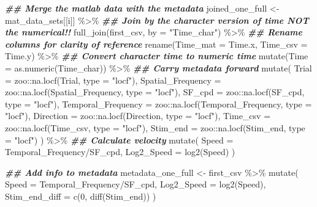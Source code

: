 \documentclass[
]{book}
\newenvironment{Shaded}{\begin{snugshade}}{\end{snugshade}}
\newcommand{\AttributeTok}[1]{\textcolor[rgb]{0.77,0.63,0.00}{#1}}
\newcommand{\DecValTok}[1]{\textcolor[rgb]{0.00,0.00,0.81}{#1}}
\newcommand{\DocumentationTok}[1]{\textcolor[rgb]{0.56,0.35,0.01}{\textbf{\textit{#1}}}}
\newcommand{\FunctionTok}[1]{\textcolor[rgb]{0.00,0.00,0.00}{#1}}
\newcommand{\NormalTok}[1]{#1}
\newcommand{\OtherTok}[1]{\textcolor[rgb]{0.56,0.35,0.01}{#1}}
\newcommand{\SpecialCharTok}[1]{\textcolor[rgb]{0.00,0.00,0.00}{#1}}
\newcommand{\StringTok}[1]{\textcolor[rgb]{0.31,0.60,0.02}{#1}}
\begin{document}
\begin{Shaded}
\begin{Highlighting}[]
  \DocumentationTok{\#\# Merge the matlab data with the metadata}
\NormalTok{  joined\_one\_full }\OtherTok{\textless{}{-}}
\NormalTok{    mat\_data\_sets[[i]] }\SpecialCharTok{\%\textgreater{}\%}
    \DocumentationTok{\#\# Join by the character version of time NOT the numerical!!}
    \FunctionTok{full\_join}\NormalTok{(first\_csv, }\AttributeTok{by =} \StringTok{"Time\_char"}\NormalTok{) }\SpecialCharTok{\%\textgreater{}\%}
    \DocumentationTok{\#\# Rename columns for clarity of reference}
    \FunctionTok{rename}\NormalTok{(}\AttributeTok{Time\_mat =}\NormalTok{ Time.x,}
           \AttributeTok{Time\_csv =}\NormalTok{ Time.y) }\SpecialCharTok{\%\textgreater{}\%}
    \DocumentationTok{\#\# Convert character time to numeric time}
    \FunctionTok{mutate}\NormalTok{(}\AttributeTok{Time =} \FunctionTok{as.numeric}\NormalTok{(Time\_char)) }\SpecialCharTok{\%\textgreater{}\%}
    \DocumentationTok{\#\# Carry metadata forward}
    \FunctionTok{mutate}\NormalTok{(}
      \AttributeTok{Trial =}\NormalTok{ zoo}\SpecialCharTok{::}\FunctionTok{na.locf}\NormalTok{(Trial, }\AttributeTok{type =} \StringTok{"locf"}\NormalTok{),}
      \AttributeTok{Spatial\_Frequency =}\NormalTok{ zoo}\SpecialCharTok{::}\FunctionTok{na.locf}\NormalTok{(Spatial\_Frequency, }\AttributeTok{type =} \StringTok{"locf"}\NormalTok{),}
      \AttributeTok{SF\_cpd =}\NormalTok{ zoo}\SpecialCharTok{::}\FunctionTok{na.locf}\NormalTok{(SF\_cpd, }\AttributeTok{type =} \StringTok{"locf"}\NormalTok{),}
      \AttributeTok{Temporal\_Frequency =}\NormalTok{ zoo}\SpecialCharTok{::}\FunctionTok{na.locf}\NormalTok{(Temporal\_Frequency, }\AttributeTok{type =} \StringTok{"locf"}\NormalTok{),}
      \AttributeTok{Direction =}\NormalTok{ zoo}\SpecialCharTok{::}\FunctionTok{na.locf}\NormalTok{(Direction, }\AttributeTok{type =} \StringTok{"locf"}\NormalTok{),}
      \AttributeTok{Time\_csv =}\NormalTok{ zoo}\SpecialCharTok{::}\FunctionTok{na.locf}\NormalTok{(Time\_csv, }\AttributeTok{type =} \StringTok{"locf"}\NormalTok{),}
      \AttributeTok{Stim\_end =}\NormalTok{ zoo}\SpecialCharTok{::}\FunctionTok{na.locf}\NormalTok{(Stim\_end, }\AttributeTok{type =} \StringTok{"locf"}\NormalTok{)}
\NormalTok{    ) }\SpecialCharTok{\%\textgreater{}\%}
    \DocumentationTok{\#\# Calculate velocity}
    \FunctionTok{mutate}\NormalTok{(}
      \AttributeTok{Speed =}\NormalTok{ Temporal\_Frequency}\SpecialCharTok{/}\NormalTok{SF\_cpd,}
      \AttributeTok{Log2\_Speed =} \FunctionTok{log2}\NormalTok{(Speed)}
\NormalTok{    )}

  \DocumentationTok{\#\# Add info to metadata}
\NormalTok{  metadata\_one\_full }\OtherTok{\textless{}{-}}
\NormalTok{    first\_csv }\SpecialCharTok{\%\textgreater{}\%}
    \FunctionTok{mutate}\NormalTok{(}
      \AttributeTok{Speed =}\NormalTok{ Temporal\_Frequency}\SpecialCharTok{/}\NormalTok{SF\_cpd,}
      \AttributeTok{Log2\_Speed =} \FunctionTok{log2}\NormalTok{(Speed),}
      \AttributeTok{Stim\_end\_diff =} \FunctionTok{c}\NormalTok{(}\DecValTok{0}\NormalTok{, }\FunctionTok{diff}\NormalTok{(Stim\_end))}
\NormalTok{    )}


\end{Highlighting}
\end{Shaded}
\end{document}
